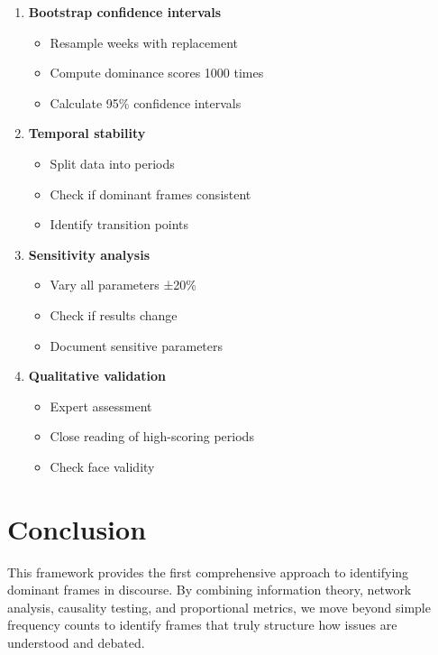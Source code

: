 \documentclass[11pt]{article}
\begin{document}
\begin{tcolorbox}[mybox={Validation Checklist}]
\begin{enumerate}
    \item \textbf{Bootstrap confidence intervals}
    \begin{itemize}
        \item Resample weeks with replacement
        \item Compute dominance scores 1000 times
        \item Calculate 95\% confidence intervals
    \end{itemize}
    
    \item \textbf{Temporal stability}
    \begin{itemize}
        \item Split data into periods
        \item Check if dominant frames consistent
        \item Identify transition points
    \end{itemize}
    
    \item \textbf{Sensitivity analysis}
    \begin{itemize}
        \item Vary all parameters ±20\%
        \item Check if results change
        \item Document sensitive parameters
    \end{itemize}
    
    \item \textbf{Qualitative validation}
    \begin{itemize}
        \item Expert assessment
        \item Close reading of high-scoring periods
        \item Check face validity
    \end{itemize}
\end{enumerate}
\end{tcolorbox}

\section{Conclusion}

This framework provides the first comprehensive approach to identifying dominant frames in discourse. By combining information theory, network analysis, causality testing, and proportional metrics, we move beyond simple frequency counts to identify frames that truly structure how issues are understood and debated.
\end{document}
